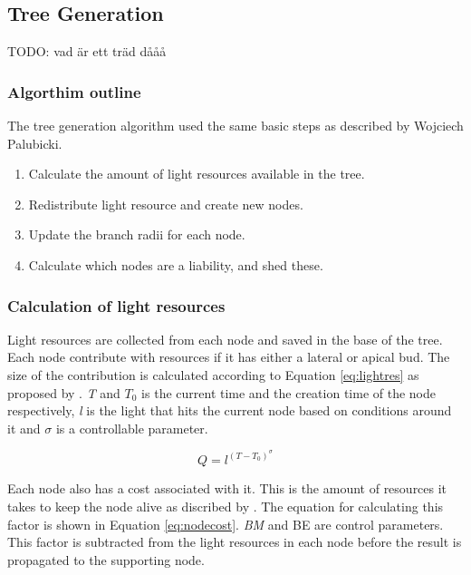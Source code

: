 \documentclass{article}
\begin{document}
  		\subsection{Tree Generation}
  			
  			TODO: vad är ett träd dååå
  			
  			\subsubsection*{Algorthim outline}
  			
  			The tree generation algorithm used the same basic steps as described by Wojciech Palubicki. \citep{palubicki2009self}
  			
  			\begin{enumerate}
  				\item Calculate the amount of light resources available in the tree.
  				\item Redistribute light resource and create new nodes.
  				\item Update the branch radii for each node.
  				\item Calculate which nodes are a liability, and shed these.
  			\end{enumerate}
  		
  			\subsubsection*{Calculation of light resources}
  			
  				Light resources are collected from each node and saved in the base of the tree. Each node contribute with resources if it has either a lateral or apical bud. The size of the contribution is calculated according to Equation \ref{eq:lightres} as proposed by \cite{yi2018tree}. \textit{T} and \textit{$T_0$} is the current time and the creation time of the node respectively, \textit{l} is the light that hits the current node based on conditions around it and $\sigma$ is a controllable parameter.
  				
  				\begin{equation}
  					\label{eq:lightres}
  					Q = l^{{(T-T_0)}^\sigma}
  				\end{equation}
  				
  				Each node also has a cost associated with it. This is the amount of resources it takes to keep the node alive as discribed by \cite{mvech1996visual}. The equation for calculating this factor is shown in Equation \ref{eq:nodecost}. \textit{BM} and BE are control parameters. This factor is subtracted from the light resources in each node before the result is propagated to the supporting node. 
  				
\end{document}
